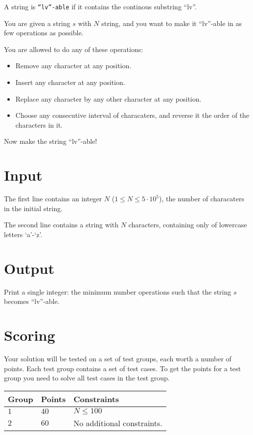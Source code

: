 \noindent
A string is \texttt{``lv''-able} if it contains the continous substring ``lv''.

You are given a string $s$ with $N$ string, and you want to make it ``lv''-able in as few operations as possible.

You are allowed to do any of these operations:
\begin{itemize}
  \item Remove any character at any position.
  \item Insert any character at any position.
  \item Replace any character by any other character at any position.
  \item Choose any consecutive interval of characaters, and reverse it the order of the characters in it.
\end{itemize}

Now make the string ``lv''-able!

\section*{Input}
The first line contains an integer $N$ ($1 \leq N \leq 5 \cdot 10^5$), the number of characaters in the initial string.

The second line contains a string with $N$ characters, containing only of lowercase letters `a'-`z'.

\section*{Output}
Print a single integer: the minimum number operations such that the string $s$ becomes ``lv''-able.

\section*{Scoring}
Your solution will be tested on a set of test groups, each worth a number of points. Each test group contains
a set of test cases. To get the points for a test group you need to solve all test cases in the test group.

\noindent
\begin{tabular}{| l | l | p{12cm} |}
  \hline
  \textbf{Group} & \textbf{Points} & \textbf{Constraints} \\ \hline
  $1$    & $40$       & $N \leq 100$ \\ \hline
  $2$    & $60$       & No additional constraints. \\ \hline
\end{tabular}
